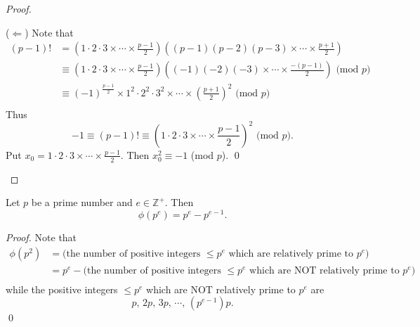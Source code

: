 \begin{proof}
\begin{enumerate}
        ($\Leftarrow$) Note that
        \begin{align*}
            \left(p-1\right)!
            &= \left(1 \cdot 2 \cdot 3 \times \cdots \times \frac{p-1}{2}\right)
            \left(\left(p-1\right) \left(p-2\right) \left(p-3\right) \times \cdots \times \frac{p+1}{2}\right) \\
            &\equiv \left(1 \cdot 2 \cdot 3 \times \cdots \times \frac{p-1}{2}\right)
            \left(\left(-1\right) \left(-2\right) \left(-3\right) \times \cdots \times \frac{-\left(p-1\right)}{2}\right)
            \mbox{ (mod $p$)} \\
            &\equiv \left(-1\right)^{\frac{p-1}{2}} \times 1^2 \cdot 2^2 \cdot 3^2 \times \cdots \times \left(\frac{p+1}{2}\right)^2
            \mbox{ (mod $p$)} \\
        \end{align*}
        Thus
        \[
            -1 \equiv \left(p-1\right)! \equiv \left(1 \cdot 2 \cdot 3 \times \cdots \times \frac{p-1}{2}\right)^2 \mbox{ (mod $p$)}.
        \]
        Put $x_0 = 1 \cdot 2 \cdot 3 \times \cdots \times \frac{p-1}{2}$. Then $x_0^2 \equiv -1$ (mod $p$).
        \qed
    \end{enumerate}
\end{proof}

\begin{theorem}
    Let $p$ be a prime number and $e \in \mathbb{Z}^+$. Then
    \[
        \phi\left(p^e\right) = p^e - p^{e-1}.    
    \]
\end{theorem}

\begin{proof}
    Note that
    \begin{align*}
        \phi\left(p^2\right) &= \mbox{(the number of positive integers $\leq p^e$ which are relatively prime to $p^e$)} \\
        &= p^e - \mbox{(the number of positive integers $\leq p^e$ which are NOT relatively prime to $p^e$)} \\
    \end{align*}
    while the positive integers $\leq p^e$ which are NOT relatively prime to $p^e$ are
    \[
        p,\,2p,\,3p,\,\cdots,\,\left(p^{e-1}\right)p.
    \]
    \qed
\end{proof}

